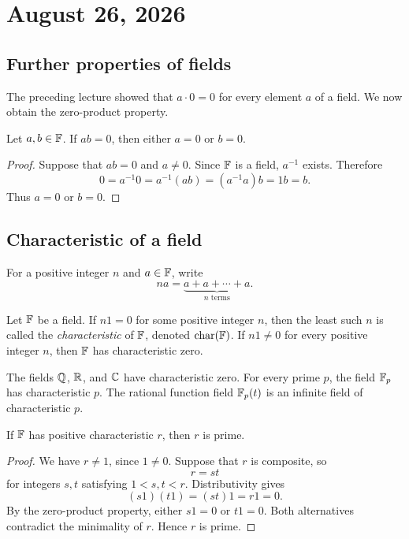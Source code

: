 \section{August 26, 2026}

\subsection{Further properties of fields}

The preceding lecture showed that $a\cdot 0=0$ for every element $a$ of
a field. We now obtain the zero-product property.

\begin{proposition}
  Let $a,b\in\mathbb{F}$. If $ab=0$, then either $a=0$ or $b=0$.
\end{proposition}

\begin{proof}
  Suppose that $ab=0$ and $a\neq0$. Since $\mathbb{F}$ is a field,
  $a^{-1}$ exists. Therefore
  \[
    0=a^{-1}0=a^{-1}(ab)=(a^{-1}a)b=1b=b.
  \]
  Thus $a=0$ or $b=0$.
\end{proof}

\subsection{Characteristic of a field}

For a positive integer $n$ and $a\in\mathbb{F}$, write
\[
  na=\underbrace{a+a+\cdots+a}_{n\text{ terms}}.
\]

\begin{definition}[Characteristic]
  Let $\mathbb{F}$ be a field. If $n1=0$ for some positive integer $n$, then
  the least such $n$ is called the \emph{characteristic} of $\mathbb{F}$,
  denoted $\operatorname{char}(\mathbb{F})$. If $n1\neq0$ for every positive
  integer $n$, then $\mathbb{F}$ has characteristic zero.
\end{definition}

The fields $\mathbb{Q}$, $\mathbb{R}$, and $\mathbb{C}$ have characteristic zero.
For every prime $p$, the field $\mathbb{F}_p$ has characteristic $p$. The
rational function field $\mathbb{F}_p(t)$ is an infinite field of
characteristic $p$.

\begin{proposition}
  If $\mathbb{F}$ has positive characteristic $r$, then $r$ is prime.
\end{proposition}

\begin{proof}
  We have $r\neq1$, since $1\neq0$. Suppose that $r$ is composite, so
  \[
    r=st
  \]
  for integers $s,t$ satisfying $1<s,t<r$. Distributivity gives
  \[
    (s1)(t1)=(st)1=r1=0.
  \]
  By the zero-product property, either $s1=0$ or $t1=0$. Both
  alternatives contradict the minimality of $r$. Hence $r$ is prime.
\end{proof}

